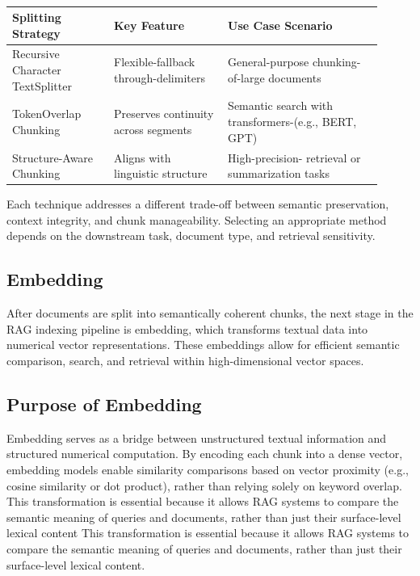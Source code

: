 \documentclass[twocolumn, 10pt]{article}
\begin{document}
\begin{table}[H]
\centering
\begin{tabular}{|p{0.25\linewidth}|p{0.28\linewidth}|p{0.38\linewidth}|}
\hline
\textbf{Splitting Strategy} & \textbf{Key Feature} & \textbf{Use Case Scenario} \\
\hline
Recursive Character TextSplitter & Flexible-fallback through-delimiters & General-purpose chunking-of-large documents \\
\hline
TokenOverlap Chunking & Preserves continuity across segments & Semantic search with transformers-(e.g., BERT, GPT) \\
\hline
Structure-Aware Chunking & Aligns with linguistic structure & High-precision- retrieval or summarization tasks \\
\hline
\end{tabular}
\caption{}
\label{tab:splitting-strategies}
\end{table}



Each technique addresses a different trade-off between semantic preservation, context integrity, and chunk manageability. Selecting an appropriate method depends on the downstream task, document type, and retrieval sensitivity.

\subsection{Embedding}

After documents are split into semantically coherent chunks, the next stage in the RAG indexing pipeline is embedding, which transforms textual data into numerical vector representations. These embeddings allow for efficient semantic comparison, search, and retrieval within high-dimensional vector spaces.

\subsection{Purpose of Embedding}

Embedding serves as a bridge between unstructured textual information and structured numerical computation. By encoding each chunk into a dense vector, embedding models enable similarity comparisons based on vector proximity (e.g., cosine similarity or dot product), rather than relying solely on keyword overlap. This transformation is essential because it allows RAG systems to compare the semantic meaning of queries and documents, rather than just their surface-level lexical content This transformation is essential because it allows RAG systems to compare the semantic meaning of queries and documents, rather than just their surface-level lexical content.
\end{document}
